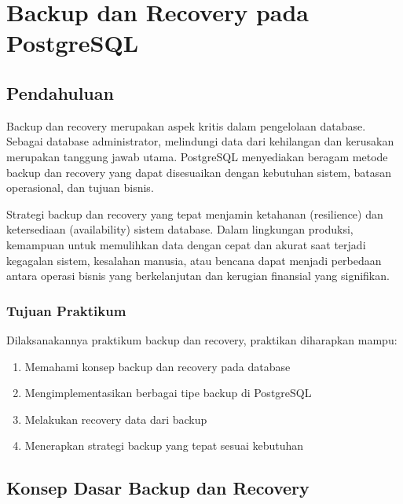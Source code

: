\chapter{Backup dan Recovery pada PostgreSQL}
\setcounter{section}{0}
\section{Pendahuluan}
Backup dan recovery merupakan aspek kritis dalam pengelolaan database. Sebagai database administrator, melindungi data dari kehilangan dan kerusakan merupakan tanggung jawab utama. PostgreSQL menyediakan beragam metode backup dan recovery yang dapat disesuaikan dengan kebutuhan sistem, batasan operasional, dan tujuan bisnis.

Strategi backup dan recovery yang tepat menjamin ketahanan (resilience) dan ketersediaan (availability) sistem database. Dalam lingkungan produksi, kemampuan untuk memulihkan data dengan cepat dan akurat saat terjadi kegagalan sistem, kesalahan manusia, atau bencana dapat menjadi perbedaan antara operasi bisnis yang berkelanjutan dan kerugian finansial yang signifikan.

\subsection{Tujuan Praktikum}
Dilaksanakannya praktikum backup dan recovery, praktikan diharapkan mampu:
\begin{enumerate}
    \item Memahami konsep backup dan recovery pada database
    \item Mengimplementasikan berbagai tipe backup di PostgreSQL
    \item Melakukan recovery data dari backup
    \item Menerapkan strategi backup yang tepat sesuai kebutuhan
\end{enumerate}

\section{Konsep Dasar Backup dan Recovery}

